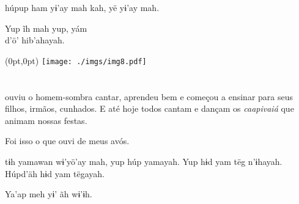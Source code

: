 \vspace{2em}

 húpup ham
yɨ’ay mah kah, yë
yɨ’ay mah.

\medskip

Yup ĩh mah yup, yám\\
d’ö’ hib’ahayah.

\vspace*{\fill}

\pagebreak

\begin{textblock*}{8in}(0pt,0pt)%
\vspace*{-2.8cm}
\hspace*{-3.2cm}\texttt{[image: ./imgs/img8.pdf]}
\end{textblock*}

\chapter*{}

\mbox{}\vspace*{\fill}

 ouviu o homem-sombra cantar,
aprendeu bem e
começou a ensinar
para seus filhos,
irmãos, cunhados.
E até hoje todos
cantam e dançam os
\textit{caapivaiá} que animam
nossas festas.

\medskip

Foi isso o que ouvi de
meus avós.

\vspace{2em}

 tɨh yamawan
wɨ’yö’ay mah, yup húp
yamayah. Yup hɨd yam
tëg n’ɨhayah. Húpd’äh
hɨd yam tëgayah.

\medskip

Ya’ap meh yɨ’ ãh wɨ’ɨh.

\vspace*{\fill}

\pagebreak

